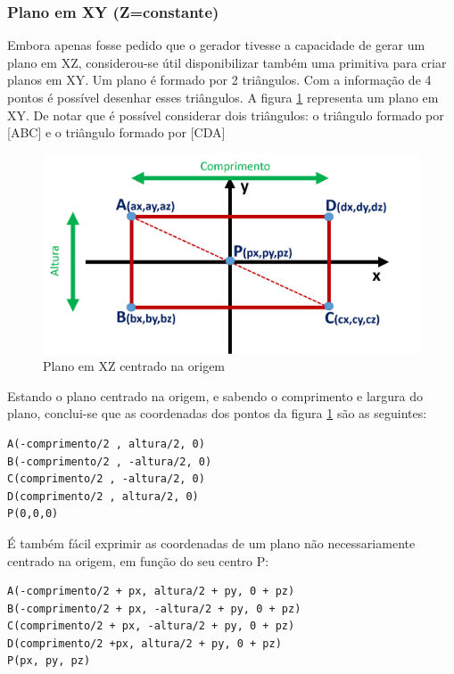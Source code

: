 \subsubsection{Plano em XY (Z=constante)}

Embora apenas fosse pedido que o gerador tivesse a capacidade de gerar um plano em XZ, considerou-se útil disponibilizar também uma primitiva para criar planos em XY.
Um plano é formado por 2 triângulos. Com a informação de 4 pontos é possível desenhar esses triângulos. A figura \ref{p1:fig:p3_planoZ} representa um plano em XY. De notar que é possível considerar dois triângulos: o triângulo formado por [ABC] e o triângulo formado por [CDA]

\begin{figure}[<+htpb+>]
	\centering
	\includegraphics[scale=0.5]{imagens/p3_planoZ.png}
	\caption{Plano em XZ centrado na origem}
	\label{p1:fig:p3_planoZ}
\end{figure}

Estando o plano centrado na origem, e sabendo o comprimento e largura do plano, conclui-se que as coordenadas dos pontos da figura \ref{p1:fig:p3_planoZ} são as seguintes:

\begin{Verbatim}
A(-comprimento/2 , altura/2, 0)
B(-comprimento/2 , -altura/2, 0)
C(comprimento/2 , -altura/2, 0)
D(comprimento/2 , altura/2, 0)
P(0,0,0)
\end{Verbatim}

É também fácil exprimir as coordenadas de um plano não necessariamente centrado na origem, em função do seu centro P:

\begin{Verbatim}
A(-comprimento/2 + px, altura/2 + py, 0 + pz)
B(-comprimento/2 + px, -altura/2 + py, 0 + pz)
C(comprimento/2 + px, -altura/2 + py, 0 + pz)
D(comprimento/2 +px, altura/2 + py, 0 + pz)
P(px, py, pz)
\end{Verbatim}

